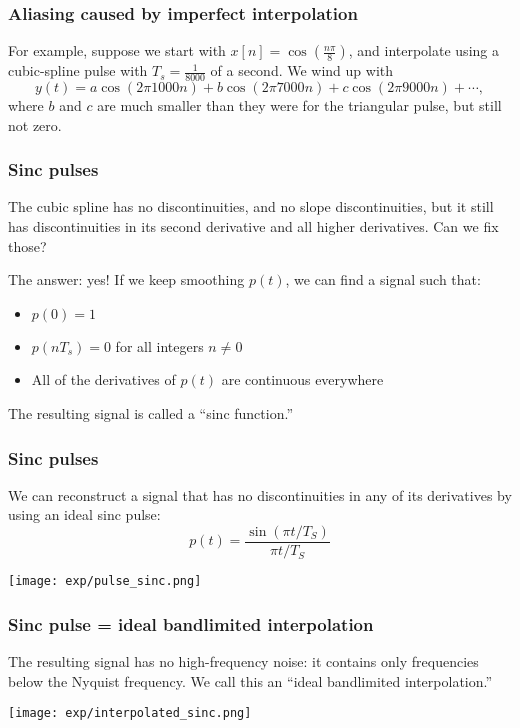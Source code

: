 \documentclass{beamer}
\begin{document}
\begin{frame}
  \frametitle{Aliasing caused by imperfect interpolation}

  For example, suppose we start with
  $x[n]=\cos\left(\frac{n\pi}{8}\right)$, and interpolate using a
  cubic-spline pulse with $T_s=\frac{1}{8000}$ of a second.  We wind up
  with
  \begin{displaymath}
    y(t) = a\cos\left(2\pi 1000 n\right)+b\cos\left(2\pi 7000n\right)+c\cos\left(2\pi 9000n\right)+\cdots,
  \end{displaymath}
  where $b$ and $c$ are much smaller than they were for the triangular pulse, but
  still not zero. 
\end{frame}

\begin{frame}
  \frametitle{Sinc pulses}

  The cubic spline has no discontinuities, and no slope  discontinuities, but it still has
  discontinuities in its second derivative and all higher derivatives.  Can we fix those?

  The answer: yes!  If we keep smoothing $p(t)$, we can find a signal such that:
  \begin{itemize}
  \item $p(0)=1$
  \item $p(nT_s)=0$ for all integers $n\ne 0$
  \item All of the derivatives of $p(t)$ are continuous everywhere
  \end{itemize}
  The resulting signal is called a ``sinc function.''
\end{frame}
  
\begin{frame}
  \frametitle{Sinc pulses}

  We can reconstruct a signal that has  no discontinuities in any of its derivatives
  by using an  ideal sinc pulse:
  \begin{displaymath}
    p(t) = \frac{\sin(\pi t/T_S)}{\pi t/T_S}
  \end{displaymath}

  \centerline{\texttt{[image: exp/pulse\_sinc.png]}}

\end{frame}

\begin{frame}
  \frametitle{Sinc pulse = ideal bandlimited interpolation}

  The resulting signal has no high-frequency noise: it contains only
  frequencies below the Nyquist frequency. We call this an ``ideal
  bandlimited interpolation.''

  \centerline{\texttt{[image: exp/interpolated\_sinc.png]}}  
\end{frame}
\end{document}
